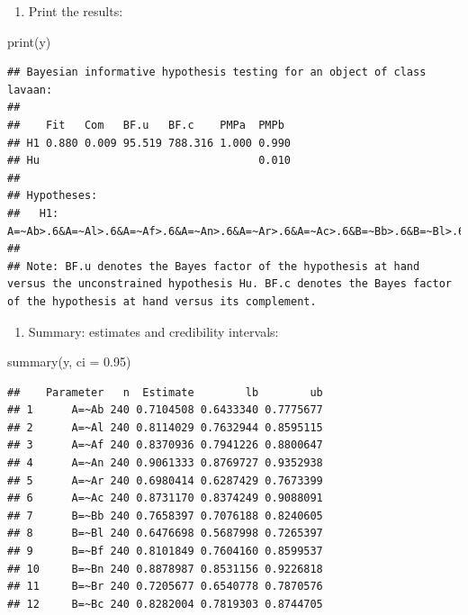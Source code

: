 \documentclass[
]{book}
\newenvironment{Shaded}{\begin{snugshade}}{\end{snugshade}}
\newcommand{\AttributeTok}[1]{\textcolor[rgb]{0.77,0.63,0.00}{#1}}
\newcommand{\FloatTok}[1]{\textcolor[rgb]{0.00,0.00,0.81}{#1}}
\newcommand{\FunctionTok}[1]{\textcolor[rgb]{0.00,0.00,0.00}{#1}}
\newcommand{\NormalTok}[1]{#1}
\providecommand{\tightlist}{%
  \setlength{\itemsep}{0pt}\setlength{\parskip}{0pt}}
\begin{document}
\begin{enumerate}
\def\labelenumi{\arabic{enumi})}
\setcounter{enumi}{3}
\tightlist
\item
  Print the results:
\end{enumerate}

\begin{Shaded}
\begin{Highlighting}[]
\FunctionTok{print}\NormalTok{(y)}
\end{Highlighting}
\end{Shaded}

\begin{verbatim}
## Bayesian informative hypothesis testing for an object of class lavaan:
## 
##    Fit   Com   BF.u   BF.c    PMPa  PMPb 
## H1 0.880 0.009 95.519 788.316 1.000 0.990
## Hu                                  0.010
## 
## Hypotheses:
##   H1: A=~Ab>.6&A=~Al>.6&A=~Af>.6&A=~An>.6&A=~Ar>.6&A=~Ac>.6&B=~Bb>.6&B=~Bl>.6&B=~Bf>.6&B=~Bn>.6&B=~Br>.6&B=~Bc>.6
## 
## Note: BF.u denotes the Bayes factor of the hypothesis at hand versus the unconstrained hypothesis Hu. BF.c denotes the Bayes factor of the hypothesis at hand versus its complement.
\end{verbatim}

\begin{enumerate}
\def\labelenumi{\arabic{enumi})}
\setcounter{enumi}{4}
\tightlist
\item
  Summary: estimates and credibility intervals:
\end{enumerate}

\begin{Shaded}
\begin{Highlighting}[]
\FunctionTok{summary}\NormalTok{(y, }\AttributeTok{ci =} \FloatTok{0.95}\NormalTok{)}
\end{Highlighting}
\end{Shaded}

\begin{verbatim}
##    Parameter   n  Estimate        lb        ub
## 1      A=~Ab 240 0.7104508 0.6433340 0.7775677
## 2      A=~Al 240 0.8114029 0.7632944 0.8595115
## 3      A=~Af 240 0.8370936 0.7941226 0.8800647
## 4      A=~An 240 0.9061333 0.8769727 0.9352938
## 5      A=~Ar 240 0.6980414 0.6287429 0.7673399
## 6      A=~Ac 240 0.8731170 0.8374249 0.9088091
## 7      B=~Bb 240 0.7658397 0.7076188 0.8240605
## 8      B=~Bl 240 0.6476698 0.5687998 0.7265397
## 9      B=~Bf 240 0.8101849 0.7604160 0.8599537
## 10     B=~Bn 240 0.8878987 0.8531156 0.9226818
## 11     B=~Br 240 0.7205677 0.6540778 0.7870576
## 12     B=~Bc 240 0.8282004 0.7819303 0.8744705
\end{verbatim}
\end{document}
